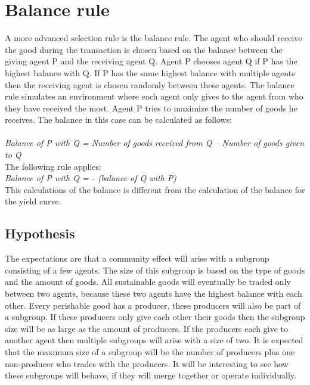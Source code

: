 \documentclass[twoside,openright]{uva-bachelor-thesis}
\begin{document}
\section{Balance rule}
A more advanced selection rule is the balance rule. The agent who should receive the good during the transaction is chosen based on the balance between the giving agent P and the receiving agent Q. Agent P chooses agent Q if P has the highest balance with Q. If P has the same highest balance with multiple agents then the receiving agent is chosen randomly between these agents. The balance rule simulates an environment where each agent only gives to the agent from who they have received the most. Agent P tries to maximize the number of goods he receives. The balance in this case can be calculated as follows: 
\\
\\
\textit{Balance of P with Q = Number of goods received from Q – Number of goods given to Q} \\
The following rule applies:\\
\textit{Balance of P with Q = - (balance of Q with P)}\\
This calculations of the balance is different from the calculation of the balance for the yield curve.\\




\subsection{Hypothesis}
The expectations are that a community effect will arise with a subgroup consisting of a few agents. The size of this subgroup is based on the type of goods and the amount of goods. All sustainable goods will eventually be traded only between two agents, because these two agents have the highest balance with each other. Every perishable good has a producer, these producers will also be part of a subgroup. If these producers only give each other their goods then the subgroup size will be as large as the amount of producers. If the producers each give to another agent then multiple subgroups will arise with a size of two. It is expected that the maximum size of a subgroup will be the number of producers plus one non-producer who trades with the producers. It will be interesting to see how these subgroups will behave, if they will merge together or operate individually.
\end{document}
